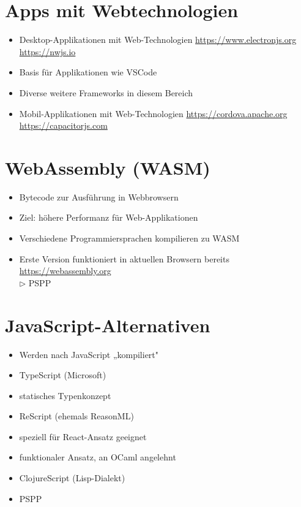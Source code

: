 \documentclass[10pt]{article}
\begin{document}
\section*{Apps mit Webtechnologien}
\begin{itemize}
  \item Desktop-Applikationen mit Web-Technologien \href{https://www.electronjs.org}{https://www.electronjs.org} \href{https://nwjs.io}{https://nwjs.io}
  \item Basis für Applikationen wie VSCode
  \item Diverse weitere Frameworks in diesem Bereich
  \item Mobil-Applikationen mit Web-Technologien \href{https://cordova.apache.org}{https://cordova.apache.org} \href{https://capacitorjs.com}{https://capacitorjs.com}
\end{itemize}

\section*{WebAssembly (WASM)}
\begin{itemize}
  \item Bytecode zur Ausführung in Webbrowsern
  \item Ziel: höhere Performanz für Web-Applikationen
  \item Verschiedene Programmiersprachen kompilieren zu WASM
  \item Erste Version funktioniert in aktuellen Browsern bereits\\
\href{https://webassembly.org}{https://webassembly.org}\\
$\triangleright$ PSPP
\end{itemize}

\section*{JavaScript-Alternativen}
\begin{itemize}
  \item Werden nach JavaScript „kompiliert"
  \item TypeScript (Microsoft)
  \item statisches Typenkonzept
  \item ReScript (ehemals ReasonML)
  \item speziell für React-Ansatz geeignet
  \item funktionaler Ansatz, an OCaml angelehnt
  \item ClojureScript (Lisp-Dialekt)
  \item PSPP
\end{itemize}
\end{document}
